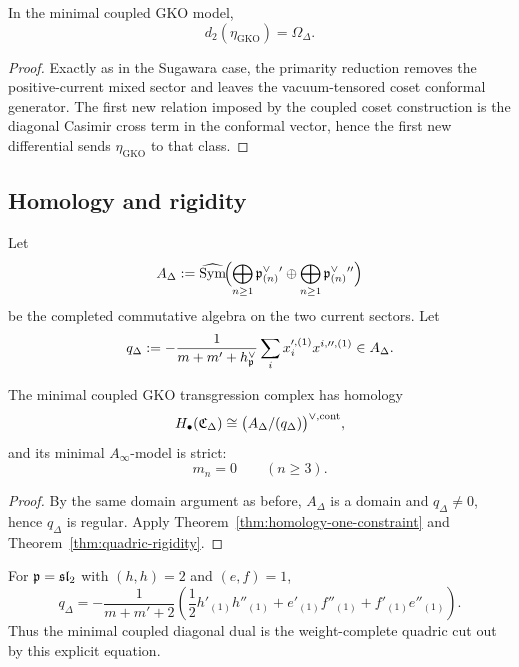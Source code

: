 \begin{theorem}\label{thm:gko-transgression}
In the minimal coupled GKO model,
\[
d_2(\eta_{\mathrm{GKO}})=\Omega_{\Delta}.
\]
\end{theorem}

\begin{proof}
Exactly as in the Sugawara case, the primarity reduction removes the positive-current mixed sector and leaves the vacuum-tensored coset conformal generator. The first new relation imposed by the coupled coset construction is the diagonal Casimir cross term in the conformal vector, hence the first new differential sends \(\eta_{\mathrm{GKO}}\) to that class.
\end{proof}

\subsection{Homology and rigidity}

Let
\[
A_{\Delta}:=
\widehat{\operatorname{Sym}}\!\Bigl(\bigoplus_{n\ge 1}\mathfrak p^\vee_{(n)}{}'\oplus \bigoplus_{n\ge 1}\mathfrak p^\vee_{(n)}{}''\Bigr)
\]
be the completed commutative algebra on the two current sectors. Let
\[
q_{\Delta}:=
-\frac{1}{m+m'+h^\vee_{\mathfrak p}}
\sum_i x_i^{\prime,(1)}x^{i,\prime\prime,(1)}\in A_{\Delta}.
\]

\begin{corollary}\label{cor:gko-formal}
The minimal coupled GKO transgression complex has homology
\[
H_\bullet(\mathfrak C_{\Delta})\cong \bigl(A_{\Delta}/(q_{\Delta})\bigr)^{\vee,\mathrm{cont}},
\]
and its minimal \(A_\infty\)-model is strict:
\[
m_n=0\qquad(n\ge 3).
\]
\end{corollary}

\begin{proof}
By the same domain argument as before, \(A_{\Delta}\) is a domain and \(q_{\Delta}\neq 0\), hence \(q_{\Delta}\) is regular. Apply Theorem~\ref{thm:homology-one-constraint} and Theorem~\ref{thm:quadric-rigidity}.
\end{proof}

\begin{example}[\(\mathfrak{sl}_2\)]
For \(\mathfrak p=\mathfrak{sl}_2\) with \((h,h)=2\) and \((e,f)=1\),
\[
q_{\Delta}
=
-\frac{1}{m+m'+2}
\left(
\frac12 h'_{(1)}h''_{(1)} + e'_{(1)}f''_{(1)} + f'_{(1)}e''_{(1)}
\right).
\]
Thus the minimal coupled diagonal dual is the weight-complete quadric cut out by this explicit equation.
\end{example}

